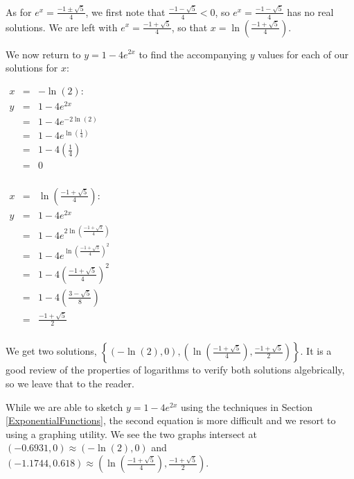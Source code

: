 \begin{ex}
\begin{enumerate}
As for $e^{x} =  \frac{-1 \pm \sqrt{5}}{4}$, we first note that $ \frac{-1 - \sqrt{5}}{4} < 0$, so $e^{x} =  \frac{-1 - \sqrt{5}}{4}$ has no real solutions.  We are left with $e^{x} =  \frac{-1 + \sqrt{5}}{4}$, so that $x = \ln\left(\frac{-1 + \sqrt{5}}{4}\right)$.  

We now return to $y = 1 - 4e^{2x}$ to find the accompanying $y$ values for each of our solutions for $x$:

\begin{center}
\begin{multicols}{2}

$\begin{array}{rcl}
x & = & -\ln(2):  \\
y & = & 1 - 4e^{2x}\\
  & = & 1 - 4e^{-2\ln(2)} \\
  & = & 1 - 4e^{\ln\left(\frac{1}{4}\right)} \\
  & = & 1 - 4\left(\frac{1}{4}\right) \\
  & = & 0 \\
\end{array}$



$\begin{array}{rcl}
x & =  & \ln\left(\frac{-1 + \sqrt{5}}{4}\right): \\
y & = & 1 - 4e^{2x} \\
  & = & 1 - 4e^{2\ln\left(\frac{-1 + \sqrt{5}}{4}\right)} \\
  & = & 1 - 4e^{\ln\left(\frac{-1 + \sqrt{5}}{4}\right)^2} \\
  & = & 1 - 4\left( \frac{-1 + \sqrt{5}}{4} \right)^2 \\
  & = & 1 - 4\left(\frac{3-\sqrt{5}}{8}\right) \\
  &  = & \frac{-1+\sqrt{5}}{2}\\

\end{array}$ \\


\end{multicols}

\end{center}

We get two solutions, $\left\{ (-\ln(2),0), \left(\ln\left(\frac{-1 + \sqrt{5}}{4}\right),\frac{-1+\sqrt{5}}{2}\right) \right\}$.  It is a good review of the properties of logarithms to verify both solutions algebrically, so we leave that to the reader.  

While we are able to sketch  $y = 1 - 4e^{2x}$ using the techniques in Section \ref{ExponentialFunctions},  the second equation is more difficult and  we resort to using a graphing utility.  We see the two graphs intersect at $(-0.6931,0) \approx (-\ln(2), 0)$ and $(-1.1744, 0.618) \approx  \left(\ln\left(\frac{-1 + \sqrt{5}}{4}\right),\frac{-1+\sqrt{5}}{2}\right)$.


\end{enumerate}
\end{ex}
